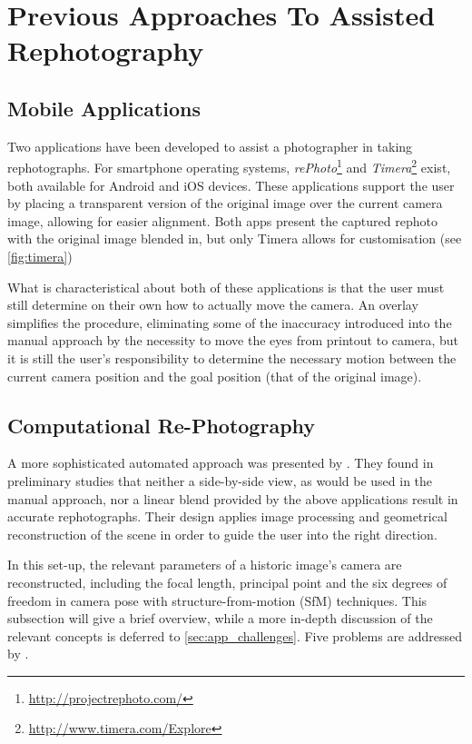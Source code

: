 \section{Previous Approaches To Assisted Rephotography}

\subsection{Mobile Applications}\label{subsec:mobile_apps}

Two applications have been developed to assist a photographer in taking
rephotographs. For smartphone operating systems,
\emph{rePhoto}\footnote{\url{http://projectrephoto.com/}} and
\emph{Timera}\footnote{\url{http://www.timera.com/Explore}} exist, both
available for Android and iOS devices. These applications support the user by placing a transparent
version of the original image over the current camera image, allowing for easier
alignment. 
Both apps present the captured rephoto with the original image blended in, but
only Timera allows for customisation (see \autoref{fig:timera})

What is characteristical about both of these applications is that the user must still
determine on their own how to actually move the camera. An overlay simplifies
the procedure, eliminating some of the inaccuracy introduced into the manual approach by the
necessity to move the eyes from printout to camera, but it is still the user's
responsibility to determine the necessary motion between the current camera
position and the goal position (that of the original image). 

\subsection{Computational Re-Photography}

A more sophisticated automated approach was presented by \citet{bae2010}. They
found in preliminary studies that neither a side-by-side view, as would be used
in the manual approach, nor a linear blend provided by the above applications
result in accurate rephotographs. Their design applies image processing and
geometrical reconstruction of the scene in order to guide the user into the right direction.

In this set-up, the relevant parameters of a historic image's camera are
reconstructed, including the focal length, principal point and the six degrees
of freedom in camera pose with structure-from-motion (SfM) techniques. This
subsection will give a brief overview, while a more in-depth discussion of the
relevant concepts is deferred to \autoref{sec:app_challenges}. Five problems
are addressed by \citet{bae2010}.

